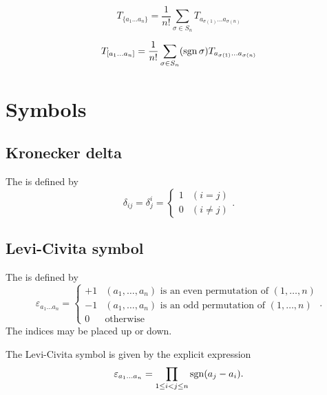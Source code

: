 \[ T_{\{a_1\dots a_n\}} = \frac{1}{n!} \sum_{\sigma\in S_n} T_{a_{\sigma(1)} \dots a_{\sigma(n)}} \]

\[ T_{[a_1\dots a_n]} = \frac{1}{n!} \sum_{\sigma\in S_n} (\operatorname{sgn} \sigma)T_{a_{\sigma(1)} \dots a_{\sigma(n)}} \]
\section{Symbols}
\subsection{Kronecker delta}
\begin{definition}
The  is defined by
\[ \delta_{ij} = \delta^i_j = \begin{cases}
1 & (i=j) \\
0 & (i \neq j)
\end{cases}.\]
\end{definition}
\subsection{Levi-Civita symbol}
\begin{definition}
The  is defined by
\[ \varepsilon_{a_{1}\ldots a_{n}} = \begin{cases}
+1 & \text{$(a_{1},\ldots, a_{n})$ is an even permutation of $(1,\ldots, n)$} \\
-1 & \text{$(a_{1},\ldots, a_{n})$ is an odd permutation of $(1,\ldots, n)$} \\
0 & \text{otherwise}
\end{cases}.\]
The indices may be placed up or down.
\end{definition}

\begin{lemma} \label{lemma:LeviCivitaProduct}
The Levi-Civita symbol is given by the explicit expression
\[ \varepsilon_{a_{1}\ldots a_{n}} = \prod_{1\leq i<j\leq n}\operatorname{sgn}(a_j-a_i).\]
\end{lemma}

